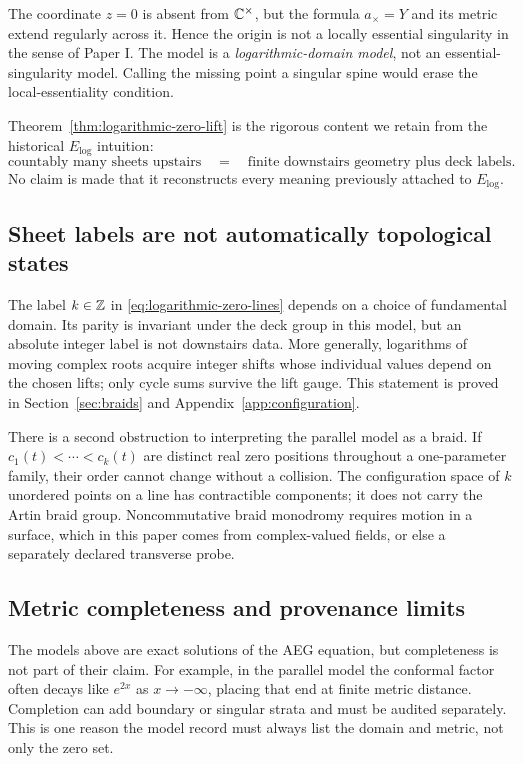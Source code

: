 \begin{remark}
The coordinate $z=0$ is absent from $\mathbb{C}^\times$, but the formula
$a_\times=Y$ and its metric extend regularly across it.  Hence the origin is not a
locally essential singularity in the sense of Paper I.  The model is a
\emph{logarithmic-domain model}, not an essential-singularity model.  Calling the
missing point a singular spine would erase the local-essentiality condition.
\end{remark}

Theorem~\ref{thm:logarithmic-zero-lift} is the rigorous content we retain from the
historical $E_{\log}$ intuition:
\[
 \text{countably many sheets upstairs}
 \quad=\quad
 \text{finite downstairs geometry plus deck labels}.
\]
No claim is made that it reconstructs every meaning previously attached to
$E_{\log}$.

\subsection{Sheet labels are not automatically topological states}

The label $k\in\mathbb{Z}$ in \eqref{eq:logarithmic-zero-lines} depends on a choice of
fundamental domain.  Its parity is invariant under the deck group in this model,
but an absolute integer label is not downstairs data.  More generally, logarithms
of moving complex roots acquire integer shifts whose individual values depend on
the chosen lifts; only cycle sums survive the lift gauge.  This statement is proved
in Section~\ref{sec:braids} and Appendix~\ref{app:configuration}.

There is a second obstruction to interpreting the parallel model as a braid.  If
$c_1(t)<\cdots<c_k(t)$ are distinct real zero positions throughout a one-parameter
family, their order cannot change without a collision.  The configuration space of
$k$ unordered points on a line has contractible components; it does not carry the
Artin braid group.  Noncommutative braid monodromy requires motion in a surface,
which in this paper comes from complex-valued fields, or else a separately declared
transverse probe.

\subsection{Metric completeness and provenance limits}

The models above are exact solutions of the AEG equation, but completeness is not
part of their claim.  For example, in the parallel model the conformal factor often
decays like $e^{2x}$ as $x\to-\infty$, placing that end at finite metric distance.
Completion can add boundary or singular strata and must be audited separately.
This is one reason the model record must always list the domain and metric, not only
the zero set.

